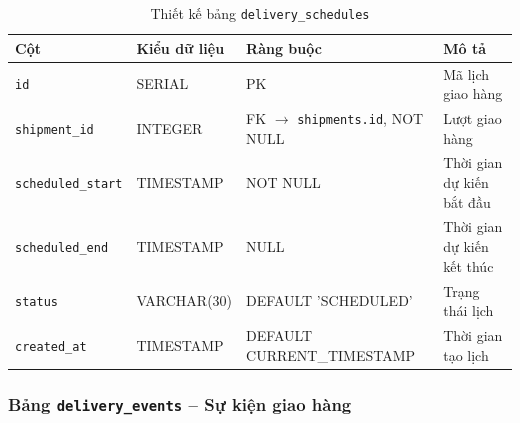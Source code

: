 \begin{table}[H]
\centering
\caption{Thiết kế bảng \texttt{delivery\_schedules}}
\begin{tabularx}{\textwidth}{|l|l|Z|Z|}
\hline
\textbf{Cột} &
\textbf{Kiểu dữ liệu} &
\textbf{Ràng buộc} &
\textbf{Mô tả} \\ \hline

\texttt{id}
& SERIAL
& PK
& Mã lịch giao hàng \\ \hline

\texttt{shipment\_id}
& INTEGER
& FK $\rightarrow$ \texttt{shipments.id}, NOT NULL
& Lượt giao hàng \\ \hline

\texttt{scheduled\_start}
& TIMESTAMP
& NOT NULL
& Thời gian dự kiến bắt đầu \\ \hline

\texttt{scheduled\_end}
& TIMESTAMP
& NULL
& Thời gian dự kiến kết thúc \\ \hline

\texttt{status}
& VARCHAR(30)
& DEFAULT 'SCHEDULED'
& Trạng thái lịch \\ \hline

\texttt{created\_at}
& TIMESTAMP
& DEFAULT CURRENT\_TIMESTAMP
& Thời gian tạo lịch \\ \hline

\end{tabularx}
\end{table}



\subsubsection{Bảng \texttt{delivery\_events} -- Sự kiện giao hàng}

